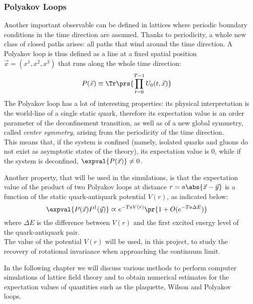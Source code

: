 \subsubsection{Polyakov Loops}
Another important observable can be defined in lattices where periodic boundary conditions in the time direction are assumed.
Thanks to periodicity, a whole new class of closed paths arises: all paths that wind around the time direction.
A Polyakov loop is thus defined as a line at a fixed spatial position $\vec{x}=(x^1,x^2,x^3)$ that runs along the whole time direction:
\begin{equation}
    P(\vec{x}) \equiv \Tr\prs{\prod_{t=0}^{T-1} U_0(t,\vec{x})} \label{1:PolyakovLoop}
\end{equation}
The Polyakov loop has a lot of interesting properties: its physical interpretation is the world-line of a single static quark, therefore its expectation value is an order parameter of the deconfinement transition, as well as of a new global symmetry, called \emph{center symmetry}, arising from the periodicity of the time direction.\\
This means that, if the system is confined (namely, isolated quarks and gluons do not exist as asymptotic states of the theory), its expectation value is $0$, while if the system is deconfined, $\expval{P(\vec{x})}\neq0$.

Another property, that will be used in the simulations, is that the expectation value of the product of two Polyakov loops at distance $r=a\abs{\vec{x}-\vec{y}}$ is a function of the static quark-antiquark potential $V(r)$, as indicated below:
\begin{equation}
    \expval{P(\vec{x})P^\dagger(\vec{y})} \varpropto e^{-TaV(r)}\pr{1+O(e^{-Ta\Delta E})} \label{1:PolyakovPotential}
\end{equation}
where $\Delta E$ is the difference between $V(r)$ and the first excited energy level of the quark-antiquark pair.\\
The value of the potential $V(r)$ will be used, in this project, to study the recovery of rotational invariance when approaching the continuum limit.

In the following chapter we will discuss various methods to perform computer simulations of lattice field theory and to obtain numerical estimates for the expectation values of quantities such as the plaquette, Wilson and Polyakov loops.
